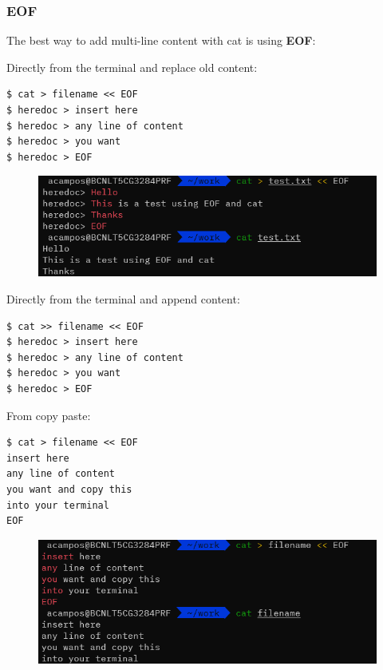 \documentclass{article}
\newenvironment{codetemplate}[1][]{%
  \mybasecolorbox[#1]
  \itshape
}{%
  \endmybasecolorbox
}
\begin{document}
\subsubsection{EOF}

The best way to add multi-line content with cat is using \textbf{EOF}:

Directly from the terminal and replace old content:
\begin{codetemplate}{}
\begin{verbatim}
$ cat > filename << EOF
$ heredoc > insert here
$ heredoc > any line of content
$ heredoc > you want
$ heredoc > EOF
\end{verbatim}
\end{codetemplate}

\begin{figure}[H]
    \centering
    \includegraphics[scale=0.8]{pictures/eof.png}
\end{figure}

Directly from the terminal and append content:
\begin{codetemplate}{}
\begin{verbatim}
$ cat >> filename << EOF
$ heredoc > insert here
$ heredoc > any line of content
$ heredoc > you want
$ heredoc > EOF
\end{verbatim}
\end{codetemplate}

From copy paste:
\begin{codetemplate}{}
\begin{verbatim}
$ cat > filename << EOF
insert here
any line of content
you want and copy this
into your terminal
EOF
\end{verbatim}
\end{codetemplate}

\begin{figure}[H]
    \centering
    \includegraphics[scale=0.8]{pictures/eof2.png}
\end{figure}
\end{document}
